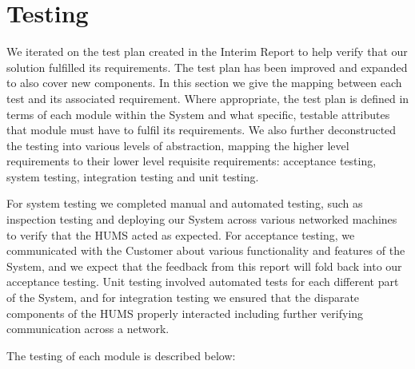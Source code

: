 \documentclass[10pt,a4paper]{article}
\begin{document}
\section{Testing}
\label{sec:testing}

We iterated on the test plan created in the Interim Report to help verify that our solution fulfilled its requirements. The test plan has been improved and expanded to also cover new components. In this section we give the mapping between each test and its associated requirement. Where appropriate, the test plan is defined in terms of each module within the System and what specific, testable attributes that module must have to fulfil its requirements. We also further deconstructed the testing into various levels of abstraction, mapping the higher level requirements to their lower level requisite requirements: acceptance testing, system testing, integration testing and unit testing.

For system testing we completed manual and automated testing, such as inspection testing and deploying our System across various networked machines to verify that the HUMS acted as expected. For acceptance testing, we communicated with the Customer about various functionality and features of the System, and we expect that the feedback from this report will fold back into our acceptance testing. Unit testing involved automated tests for each different part of the System, and for integration testing we ensured that the disparate components of the HUMS properly interacted including further verifying communication across a network.

The testing of each module is described below:
\end{document}
